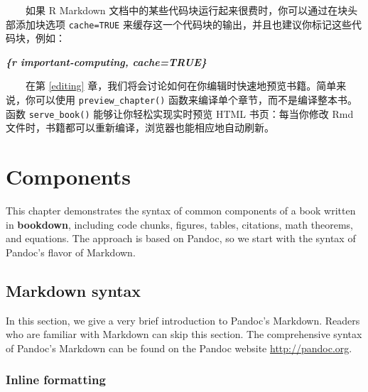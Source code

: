 \documentclass[
  12pt,
]{krantz}
\newenvironment{Shaded}{\begin{snugshade}}{\end{snugshade}}
\newcommand{\InformationTok}[1]{\textcolor[rgb]{0.56,0.35,0.01}{\textbf{\textit{#1}}}}
\theoremstyle{definition}
\theoremstyle{definition}
\theoremstyle{definition}
\theoremstyle{definition}
\theoremstyle{remark}
\begin{document}
  如果 R Markdown 文档中的某些代码块运行起来很费时，你可以通过在块头部添加块选项 \texttt{cache=TRUE} 来缓存这一个代码块的输出，并且也建议你标记这些代码块，例如：

\begin{Shaded}
\begin{Highlighting}[]
\InformationTok{\textasciigrave{}\textasciigrave{}\textasciigrave{}\{r important{-}computing, cache=TRUE\}}
\end{Highlighting}
\end{Shaded}

  在第 \ref{editing} 章，我们将会讨论如何在你编辑时快速地预览书籍。简单来说，你可以使用 \texttt{preview\_chapter()} 函数来编译单个章节，而不是编译整本书。函数 \texttt{serve\_book()} 能够让你轻松实现实时预览 HTML 书页：每当你修改 Rmd 文件时，书籍都可以重新编译，浏览器也能相应地自动刷新。

\hypertarget{components}{%
\chapter{Components}\label{components}}

This chapter demonstrates the syntax of common components of a book written in \textbf{bookdown}, including code chunks, figures, tables, citations, math theorems, and equations. The approach is based on Pandoc, so we start with the syntax of Pandoc's flavor of Markdown.

\hypertarget{markdown-syntax}{%
\section{Markdown syntax}\label{markdown-syntax}}

In this section, we give a very brief introduction to Pandoc's Markdown. Readers who are familiar with Markdown can skip this section. The comprehensive syntax of Pandoc's Markdown can be found on the Pandoc website \url{http://pandoc.org}.

\hypertarget{inline-formatting}{%
\subsection{Inline formatting}\label{inline-formatting}}
\end{document}

